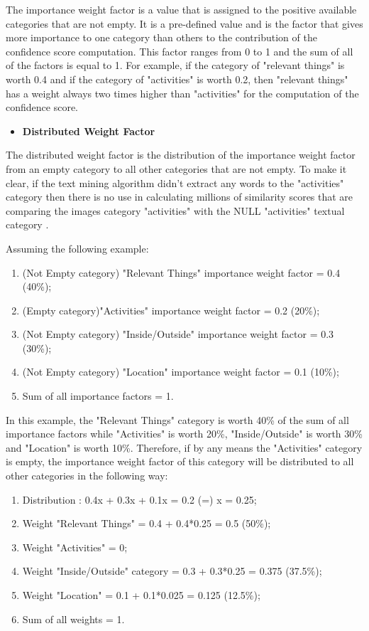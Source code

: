     The importance weight factor is a value that is assigned to the positive available categories that are not empty. It is a pre-defined value and is the factor that gives more importance to one category than others to the contribution of the confidence score computation. This factor ranges from 0 to 1 and the sum of all of the factors is equal to 1. For example, if the category of "relevant things" is worth 0.4 and if the category of "activities" is worth 0.2, then "relevant things" has a weight always two times higher than "activities" for the computation of the confidence score.

    \begin{itemize}
      \item \textbf{Distributed Weight Factor}
    \end{itemize}

    The distributed weight factor is the distribution of the importance weight factor from an empty category to all other categories that are not empty. To make it clear, if the text mining algorithm didn't extract any words to the "activities" category then there is no use in calculating millions of similarity scores that are comparing the images category "activities" with the NULL "activities" textual category . 

        
   Assuming the following example:
   \begin{enumerate}
    \item (Not Empty category) "Relevant Things" importance weight factor = 0.4 (40\%);
    \item (Empty category)"Activities" importance weight factor =  0.2 (20\%);
    \item (Not Empty category) "Inside/Outside" importance weight factor = 0.3 (30\%);
    \item (Not Empty category) "Location" importance weight factor = 0.1 (10\%);
    \item Sum of all importance factors = 1.
   \end{enumerate}

   In this example, the "Relevant Things" category is worth 40\% of the sum of all importance factors while "Activities" is worth 20\%, "Inside/Outside" is worth 30\% and "Location" is worth 10\%. Therefore, if by any means the "Activities" category is empty, the importance weight factor of this category will be distributed to all other categories in the following way:

   \begin{enumerate}
    \item Distribution : 0.4x + 0.3x + 0.1x = 0.2 (=) x = 0.25;
    \item Weight "Relevant Things" = 0.4 + 0.4*0.25 = 0.5 (50\%);
    \item Weight "Activities" = 0;
    \item Weight "Inside/Outside" category = 0.3 + 0.3*0.25 = 0.375 (37.5\%);
    \item Weight "Location" =  0.1 + 0.1*0.025 = 0.125 (12.5\%);
    \item Sum of all weights = 1.
   \end{enumerate}


